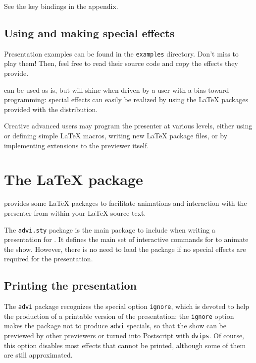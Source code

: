 \documentclass[12pt]{article}
\begin{document}
See the key bindings in the appendix.

\subsection{Using and making special effects}

Presentation examples can be found in the \verb"examples"
directory. Don't miss to play them! Then, feel free to read their
source code and copy the effects they provide.

{\ActiveDVI} can be used as is, but will shine when driven by a user
with a bias toward programming: special effects can easily be realized
by using the {\LaTeX} packages provided with the distribution.

Creative advanced users may program the presenter at various levels, either
using or defining simple {\LaTeX} macros, writing new {\LaTeX} package
files, or by implementing extensions to the previewer itself.


\section{The  {\LaTeX} package}


{\ActiveDVI} provides some {\LaTeX} packages to facilitate animations and
interaction with the presenter from within your {\LaTeX} source text.

The {\tt advi.sty} package is the main package to include when writing
a presentation for {\ActiveDVI}. It defines the main set of interactive
commands for {\ActiveDVI} to animate the show. However, there is no
need to load the package if no {\ActiveDVI} special effects are
required for the presentation.

\subsection{Printing the presentation}

The {\tt advi} package recognizes the special option \verb"ignore",
which is devoted to help the production of a printable version of the
presentation: the \verb"ignore" option makes the package not to
produce {\tt advi} specials, so that the show can be previewed by
other previewers or turned into Postscript with {\tt dvips}. Of
course, this option disables most effects that cannot be printed,
although some of them are still approximated.
\end{document}

